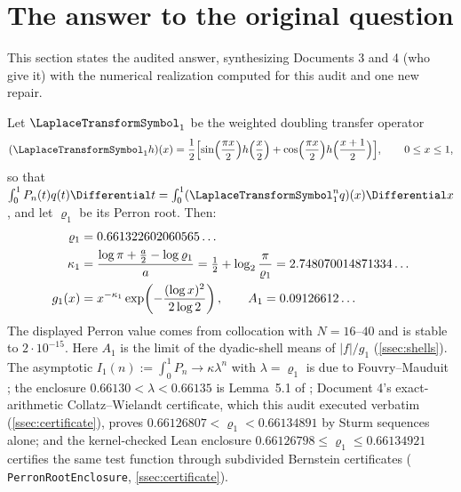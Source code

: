 \documentclass[11pt,oneside]{article}
\theoremstyle{definition}
\theoremstyle{remark}
\newcommand{\lean}[1]{%
  \ifmmode\text{\nolinkurl{#1}}\else\nolinkurl{#1}\fi}
\begin{document}
\section{The answer to the original question}
\label{sec:answer}

This section states the audited answer, synthesizing Documents 3 and 4
(who give it) with the numerical realization computed for this audit and
one new repair.

Let $\LaplaceTransformSymbol_1$ be the weighted doubling transfer operator
\begin{equation}
 (\LaplaceTransformSymbol_1 h)(x)
 =\frac12\Bigl[\sin\Bigl(\frac{\pi x}{2}\Bigr)h\Bigl(\frac x2\Bigr)
 +\cos\Bigl(\frac{\pi x}{2}\Bigr)h\Bigl(\frac{x+1}{2}\Bigr)\Bigr],
 \qquad 0\le x\le1,
 \label{eq:L1}
\end{equation}
so that $\int_0^1P_n(t)q(t)\Differential t=\int_0^1(\LaplaceTransformSymbol_1^nq)(x)\Differential x$, and let
$\varrho_1$ be its Perron root.  Then:
\begin{align}
 \varrho_1&=0.661322602060565\ldots\notag\\
 \kappa_1&=\frac{\log\pi+\frac a2-\log\varrho_1}{a}
 =\tfrac12+\log_2\frac{\pi}{\varrho_1}
 =2.748070014871334\ldots\notag\\
 g_1(x)&=x^{-\kappa_1}\exp\!\left(-\frac{(\log x)^2}{2\log2}\right),
 \qquad
 A_1=0.09126612\ldots
 \label{eq:gauge}
\end{align}
The displayed Perron value comes from collocation with $N=16$--$40$ and is
stable to $2\cdot10^{-15}$.
Here $A_1$ is the limit of the dyadic-shell means of $|f|/g_1$
(\cref{ssec:shells}).  The asymptotic $I_1(n):=\int_0^1P_n\to\kappa
\lambda^n$ with $\lambda=\varrho_1$ is due to Fouvry--Mauduit
\cite{fouvrymauduit1996}; the enclosure $0.66130<\lambda<0.66135$ is
Lemma~5.1 of \cite{ahl2017}; Document 4's exact-arithmetic
Collatz--Wielandt certificate, which this audit executed verbatim
(\cref{ssec:certificate}), proves $0.66126807<\varrho_1<0.66134891$
by Sturm sequences alone; and the kernel-checked Lean enclosure
$0.66126798\le\varrho_1\le0.66134921$ certifies the same test
function through subdivided Bernstein certificates
(\lean{PerronRootEnclosure}, \cref{ssec:certificate}).
\end{document}
